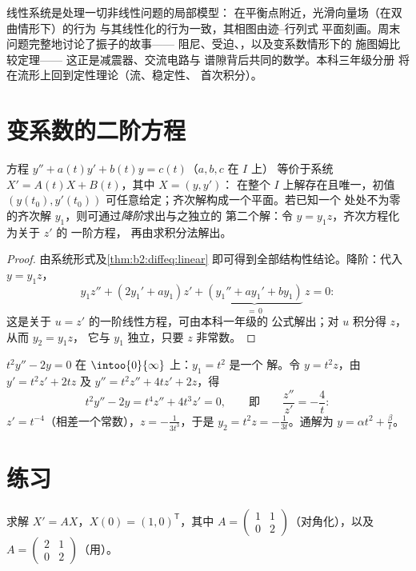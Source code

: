 \begin{remark}[应用]
线性系统是处理一切非线性问题的局部模型：
在平衡点附近，光滑向量场（在双曲情形下）的行为
与其线性化的行为一致，其相图由迹--行列式
平面刻画。周末问题完整地讨论了振子的故事——
阻尼、受迫、，以及变系数情形下的
施图姆比较定理——
这正是减震器、交流电路与
谱隙背后共同的数学。本科三年级分册
将在流形上回到定性理论（流、稳定性、
首次积分）。
\end{remark}

\section{变系数的二阶方程}

\begin{proposition}\label{prop:b2:diffeq:secondorder}
方程 $y'' + a(t)y' + b(t)y = c(t)$（$a, b, c$ 在 $I$ 上）
等价于系统 $X' = A(t)X + B(t)$，其中 $X = (y, y')$：
在整个 $I$ 上解存在且唯一，初值 $(y(t_0),
y'(t_0))$ 可任意给定；齐次解构成一个平面。若已知一个
处处不为零的齐次解 $y_1$，则可通过\emph{降阶}求出与之独立的
第二个解：令 $y = y_1 z$，齐次方程化为关于 $z'$ 的
一阶方程，
再由求积分法解出。
\end{proposition}

\begin{proof}
由系统形式及\cref{thm:b2:diffeq:linear}
即可得到全部结构性结论。降阶：代入 $y = y_1z$，
\[
y_1 z'' + (2y_1' + a y_1)z' + \underbrace{(y_1'' + ay_1' +
by_1)}_{=\,0}\,z = 0 :
\]
这是关于 $u = z'$ 的一阶线性方程，可由本科一年级的
公式解出；对 $u$ 积分得 $z$，从而 $y_2 = y_1 z$，
它与 $y_1$ 独立，只要 $z$ 非常数。
\end{proof}

\begin{example}\label{ex:b2:diffeq:lowering}
$t^2y'' - 2y = 0$ 在 $\intoo{0}{\infty}$ 上：$y_1 = t^2$ 是一个
解。令 $y = t^2z$，由 $y' = t^2z' + 2tz$ 及 $y''
= t^2z'' + 4tz' + 2z$，得
\[
t^2y'' - 2y = t^4 z'' + 4t^3z' = 0,
\qquad\text{即}\qquad \frac{z''}{z'} = -\frac4t :
\]
$z' = t^{-4}$（相差一个常数），$z = -\frac{1}{3t^3}$，于是 $y_2
= t^2z = -\frac{1}{3t}$。通解为 $y = \alpha t^2 +
\frac{\beta}{t}$。
\end{example}

\section{练习}

\begin{exercise}[$\star$]\label{exo:b2:diffeq:1}
求解 $X' = AX$，$X(0) = (1, 0)^{\mathsf T}$，其中 $A =
\begin{pmatrix} 1 & 1\\ 0 & 2\end{pmatrix}$（对角化），以及 $A =
\begin{pmatrix} 2 & 1\\ 0 & 2 \end{pmatrix}$（用）。
\end{exercise}

